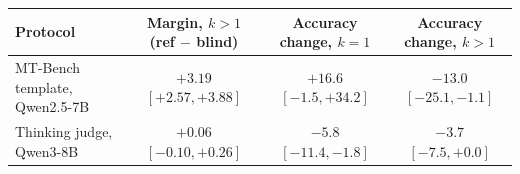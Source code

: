 \begin{tabular}{lccc}
\toprule
Protocol & Margin, $k{>}1$ (ref $-$ blind) & Accuracy change, $k{=}1$ & Accuracy change, $k{>}1$ \\
\midrule
MT-Bench template, Qwen2.5-7B & $+3.19$ {\scriptsize$[+2.57,+3.88]$} & $+16.6$ {\scriptsize$[-1.5,+34.2]$} & $-13.0$ {\scriptsize$[-25.1,-1.1]$} \\
Thinking judge, Qwen3-8B & $+0.06$ {\scriptsize$[-0.10,+0.26]$} & $-5.8$ {\scriptsize$[-11.4,-1.8]$} & $-3.7$ {\scriptsize$[-7.5,+0.0]$} \\
\bottomrule
\end{tabular}
